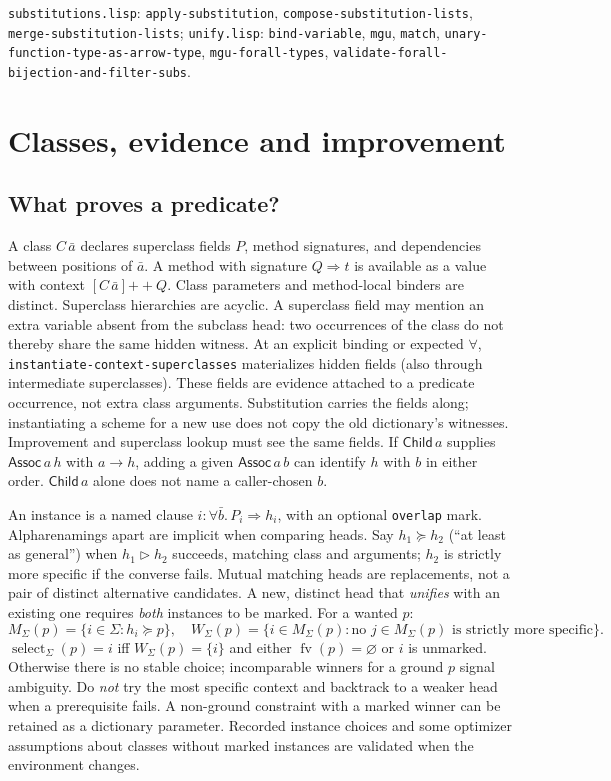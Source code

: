 \documentclass[11pt]{article}
\theoremstyle{definition}
\newcommand{\code}[1]{\texttt{#1}}
\newcommand{\src}[1]{\nolinkurl{#1}}
\newcommand{\fv}{\operatorname{fv}}
\newcommand{\sel}{\operatorname{select}}
\newcommand{\oneway}{\mathrel{\triangleright}}
\begin{document}
\sources \src{substitutions.lisp}: \src{apply-substitution},
\src{compose-substitution-lists}, \src{merge-substitution-lists};
\src{unify.lisp}: \src{bind-variable}, \src{mgu}, \src{match}, \src{unary-function-type-as-arrow-type},
\src{mgu-forall-types}, \src{validate-forall-bijection-and-filter-subs}.

\section{Classes, evidence and improvement}\label{sec:classes}

\subsection{What proves a predicate?}
A class $C\,\bar a$ declares superclass fields $P$, method signatures,
and dependencies between positions of $\bar a$. A method with signature
$Q\Rightarrow t$ is available as a value with context
$[C\,\bar a]\mathbin{+\!\!+} Q$. Class parameters and method-local binders
are distinct. Superclass hierarchies are acyclic. A superclass field may
mention an extra variable absent from the subclass head: two occurrences of
the class do not thereby share the same hidden witness. At an explicit
binding or expected $\forall$, \src{instantiate-context-superclasses}
materializes hidden fields (also through intermediate superclasses).
These fields are evidence attached to a predicate occurrence, not extra
class arguments. Substitution carries the fields along; instantiating a
scheme for a new use does not copy the old dictionary's witnesses.
Improvement and superclass lookup must see the same fields. If
$\mathsf{Child}\,a$ supplies $\mathsf{Assoc}\,a\,h$ with $a\to h$,
adding a given $\mathsf{Assoc}\,a\,b$ can identify $h$ with $b$ in
either order. $\mathsf{Child}\,a$ alone does not name a caller-chosen $b$.

An instance is a named clause $i:\forall\bar b.\,P_i\Rightarrow h_i$, with
an optional \code{overlap} mark. Alpharenamings apart are implicit when
comparing heads. Say $h_1\succeq h_2$ (``at least as general'') when
$h_1\oneway h_2$ succeeds, matching class and arguments; $h_2$ is strictly
more specific if the converse fails. Mutual matching heads are replacements,
not a pair of distinct alternative candidates. A new, distinct head that
\emph{unifies} with an existing one requires \emph{both} instances to be
marked. For a wanted $p$:
\[
 M_\Sigma(p)=\{i\in\Sigma:h_i\succeq p\},\quad
 W_\Sigma(p)=\{i\in M_\Sigma(p):\text{no }j\in M_\Sigma(p)
                      \text{ is strictly more specific}\}.
\]
$\sel_\Sigma(p)=i$ iff $W_\Sigma(p)=\{i\}$ and either $\fv(p)=\varnothing$ or $i$ is
unmarked. Otherwise there is no stable choice; incomparable winners for
a ground $p$ signal ambiguity. Do \emph{not} try the most specific context
and backtrack to a weaker head when a prerequisite fails. A non-ground
constraint with a marked winner can be retained as a dictionary parameter.
Recorded instance choices and some optimizer assumptions about classes
without marked instances are validated when the environment changes.
\end{document}
